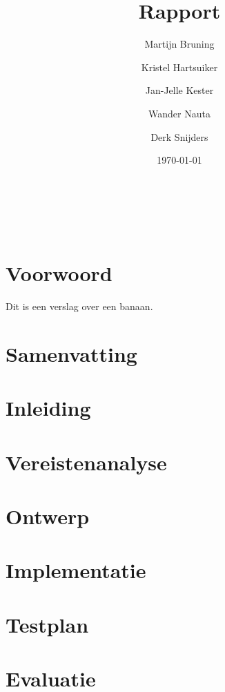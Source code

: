 \documentclass[twoside,openright,parskip]{scrreprt}
\title{Rapport}
\author{
     Martijn Bruning
\and Kristel Hartsuiker
\and Jan-Jelle Kester
\and Wander Nauta
\and Derk Snijders
}
\date{\today}
\begin{document}
\renewcommand*\rmdefault{ppl}
\renewcommand*\sfdefault{ppl}

\begin{titlepage}
	{\Huge \thetitle} \\
	\vfill
	\theauthor \\
	\thedate
\end{titlepage}

\chapter{Voorwoord}

Dit is een verslag over een \gls{banaan}.

\chapter{Samenvatting}

\lipsum

\tableofcontents

\chapter{Inleiding}

\lipsum

\chapter{Vereistenanalyse}

\lipsum

\chapter{Ontwerp}

\lipsum

\chapter{Implementatie}

\lipsum

\chapter{Testplan}

\lipsum

\chapter{Evaluatie}
\end{document}
